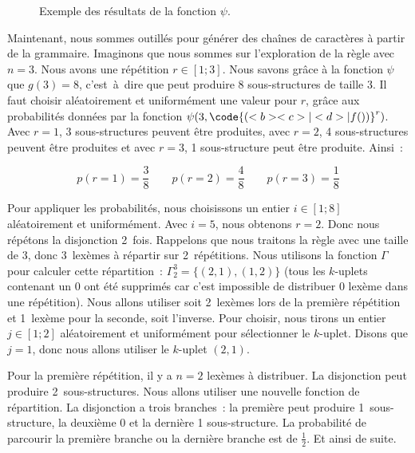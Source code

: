 \begin{example}
\begin{figure}
\begin{center}
\begin{tabular}{c|cc|cccccccccccc}
\hline

\end{tabular}
\end{center}

\caption{\label{figure:data:random_tabular} Exemple des résultats de la fonction
$\psi$.}

\end{figure}

Maintenant, nous sommes outillés pour générer des chaînes de caractères à partir
de la grammaire. Imaginons que nous sommes sur l'exploration de la règle
 avec $n = 3$. Nous avons une répétition $r \in [1; 3]$. Nous savons
grâce à la fonction $\psi$ que $g(3) = 8$, c'est~à~dire que  peut
produire 8 sous-structures de taille 3. Il faut choisir aléatoirement et
uniformément une valeur pour $r$, grâce aux probabilités données par la fonction
$\psi(3, \code{( <b> <c> | <d> | f() )}^r)$. Avec $r = 1$, 3 sous-structures
peuvent être produites, avec $r = 2$, 4 sous-structures peuvent être produites
et avec $r = 3$, 1 sous-structure peut être produite. Ainsi~:

$$
p(r = 1) = \frac{3}{8} \qquad
p(r = 2) = \frac{4}{8} \qquad
p(r = 3) = \frac{1}{8}
$$

Pour appliquer les probabilités, nous choisissons un entier $i \in [1; 8]$
aléatoirement et uniformément. Avec $i = 5$, nous obtenons $r = 2$.
%
%
%
%
%
%
%
%
Donc nous répétons la disjonction 2~fois. Rappelons que nous traitons la règle
 avec une taille de 3, donc 3~lexèmes à répartir sur 2~répétitions. Nous
utilisons la fonction $\Gamma$ pour calculer cette répartition~: $\Gamma_2^3 =
\{(2, 1), (1, 2)\}$ (tous les $k$-uplets contenant un 0 ont été supprimés car
c'est impossible de distribuer 0 lexème dans une répétition). Nous allons
utiliser soit 2~lexèmes lors de la première répétition et 1~lexème pour la
seconde, soit l'inverse. Pour choisir, nous tirons un entier $j \in [1;
2]$ aléatoirement et uniformément pour sélectionner le $k$-uplet. Disons que $j
= 1$, donc nous allons utiliser le $k$-uplet $(2, 1)$.

Pour la première répétition, il y a $n = 2$ lexèmes à distribuer. La disjonction
peut produire 2~sous-structures. Nous allons utiliser une nouvelle fonction de
répartition. La disjonction a trois branches~: la première peut produire
1~sous-structure, la deuxième 0 et la dernière 1 sous-structure.  La probabilité
de parcourir la première branche ou la dernière branche est de $\tfrac{1}{2}$.
Et ainsi de suite.

\end{example}

